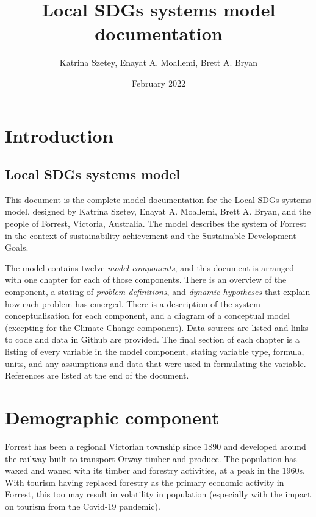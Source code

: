 \documentclass[
  11pt,
]{book}
\title{Local SDGs systems model documentation}
\author{Katrina Szetey, Enayat A. Moallemi, Brett A. Bryan}
\date{February 2022}
\begin{document}
\maketitle

{
\hypersetup{linkcolor=}
\setcounter{tocdepth}{1}
\tableofcontents
}
\hypertarget{introduction}{%
\chapter*{Introduction}\label{introduction}}

\hypertarget{local-sdgs-systems-model}{%
\section*{Local SDGs systems model}\label{local-sdgs-systems-model}}

This document is the complete model documentation for the Local SDGs systems model, designed by Katrina Szetey, Enayat A. Moallemi, Brett A. Bryan, and the people of Forrest, Victoria, Australia. The model describes the system of Forrest in the context of sustainability achievement and the Sustainable Development Goals.

The model contains twelve \emph{model components}, and this document is arranged with one chapter for each of those components. There is an overview of the component, a stating of \emph{problem definitions}, and \emph{dynamic hypotheses} that explain how each problem has emerged. There is a description of the system conceptualisation for each component, and a diagram of a conceptual model (excepting for the Climate Change component). Data sources are listed and links to code and data in Github are provided. The final section of each chapter is a listing of every variable in the model component, stating variable type, formula, units, and any assumptions and data that were used in formulating the variable. References are listed at the end of the document.

\hypertarget{demographic-component}{%
\chapter{Demographic component}\label{demographic-component}}

Forrest has been a regional Victorian township since 1890 and developed around the railway built to transport Otway timber and produce. The population has waxed and waned with its timber and forestry activities, at a peak in the 1960s. With tourism having replaced forestry as the primary economic activity in Forrest, this too may result in volatility in population (especially with the impact on tourism from the Covid-19 pandemic).
\end{document}
